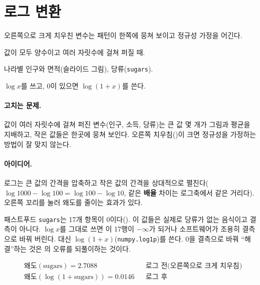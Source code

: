 \section{로그 변환}
\label{sec:log-transform}

\begin{inbrief}
  \item[Why] 오른쪽으로 크게 치우친 변수는 패턴이 한쪽에 뭉쳐 보이고
             정규성 가정을 어긴다.
  \item[When] 값이 모두 양수이고 여러 자릿수에 걸쳐 퍼질 때.
  \item[Where] 나라별 인구와 면적(슬라이드 그림), 당류(\texttt{sugars}).
  \item[How] $\log x$를 쓰고, 0이 있으면 $\log(1+x)$를 쓴다.
\end{inbrief}

\paragraph{고치는 문제.} 값이 여러 자릿수에 걸쳐 퍼진 변수(인구, 소득,
당류)는 큰 값 몇 개가 그림과 평균을 지배하고, 작은 값들은 한곳에
뭉쳐 보인다. 오른쪽 치우침()이 크면 정규성을
가정하는 방법이 잘 맞지 않는다.

\paragraph{아이디어.} 로그는 큰 값의 간격을 압축하고 작은 값의 간격을
상대적으로 펼친다($\log 1000 - \log 100 = \log 100 - \log 10$, 같은
\textbf{배율} 차이는 로그축에서 같은 거리다). 오른쪽 꼬리를 눌러
왜도를 줄이는 효과가 있다.

\begin{pitfall}
패스트푸드 \texttt{sugars}는 17개 항목이 0이다().
이 값들은 실제로 당류가 없는 음식이고 결측이 아니다. $\log x$를 그대로
쓰면 이 17행이 $-\infty$가 되거나 소프트웨어가 조용히 결측으로 바꿔
버린다. 대신 $\log(1+x)$(\texttt{numpy.log1p})를 쓴다. 0을 결측으로
바꿔 ``해결''하는 것은 의 오류를 되풀이하는
것이다.
\end{pitfall}

\begin{align*}
  &\text{왜도}(\text{sugars}) = 2.7088 && \text{로그 전(오른쪽으로 크게 치우침)}\\
  &\text{왜도}(\log(1+\text{sugars})) = 0.0146 && \text{로그 후}
\end{align*}


